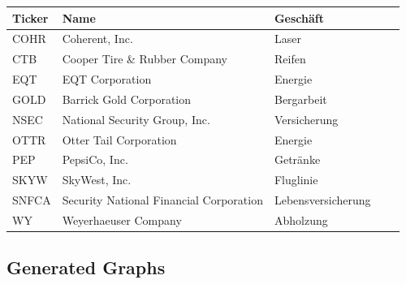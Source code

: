 \documentclass[12pt]{article}
\begin{document}
            \begin{table}[htp]
                \begin{center}
                    
                    \begin{tabular}{ | l | l | l | l | l | }

                        \hline
                        \textbf{Ticker}      & \textbf{Name}                             & \textbf{Geschäft} \\
                        \hline
                        COHR                 & Coherent, Inc.                            & Laser \\
                        CTB                  & Cooper Tire \& Rubber Company             & Reifen \\
                        EQT                  & EQT Corporation                           & Energie \\
                        GOLD                 & Barrick Gold Corporation                  & Bergarbeit \\
                        NSEC                 & National Security Group, Inc.             & Versicherung \\
                        OTTR                 & Otter Tail Corporation                    & Energie \\
                        PEP                  & PepsiCo, Inc.                             & Getränke \\
                        SKYW                 & SkyWest, Inc.                             & Fluglinie \\
                        SNFCA                & Security National Financial Corporation   & Lebensversicherung \\
                        WY                   & Weyerhaeuser Company                      & Abholzung \\
                        \hline

                    \end{tabular}

                \end{center}
            \end{table}

        \subsection{Generated Graphs}
         
\end{document}
